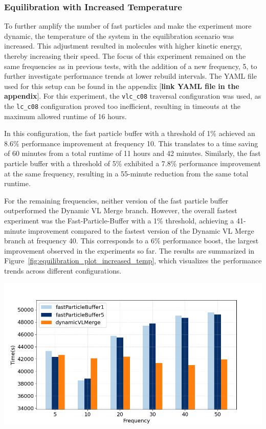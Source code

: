 \clearpage
\subsubsection{Equilibration with Increased Temperature}

To further amplify the number of fast particles and make the experiment more dynamic, the temperature of the system in the equilibration scenario was increased. This adjustment resulted in molecules with higher kinetic energy, thereby increasing their speed. The focus of this experiment remained on the same frequencies as in previous tests, with the addition of a new frequency, 5, to further investigate performance trends at lower rebuild intervals. The YAML file used for this setup can be found in the appendix [\textbf{link YAML file in the appendix}]. For this experiment, the \texttt{vlc\_c08} traversal configuration was used, as the \texttt{lc\_c08} configuration proved too inefficient, resulting in timeouts at the maximum allowed runtime of 16 hours.

In this configuration, the fast particle buffer with a threshold of 1\% achieved an 8.6\% performance improvement at frequency 10. This translates to a time saving of 60 minutes from a total runtime of 11 hours and 42 minutes. Similarly, the fast particle buffer with a threshold of 5\% exhibited a 7.8\% performance improvement at the same frequency, resulting in a 55-minute reduction from the same total runtime.

For the remaining frequencies, neither version of the fast particle buffer outperformed the Dynamic VL Merge branch. However, the overall fastest experiment was the Fast-Particle-Buffer with a 1\% threshold, achieving a 41-minute improvement compared to the fastest version of the Dynamic VL Merge branch at frequency 40. This corresponds to a 6\% performance boost, the largest improvement observed in the experiments so far. The results are summarized in Figure~\ref{fig:equilibration_plot_increased_temp}, which visualizes the performance trends across different configurations.

\begin{center}
\includegraphics[width=0.8\linewidth]{graphs/spinodalDecomposition/vlcc08_increased.png}
\captionsetup{hypcap=false}
\label{fig:equilibration_plot_increased_temp}
\end{center}


